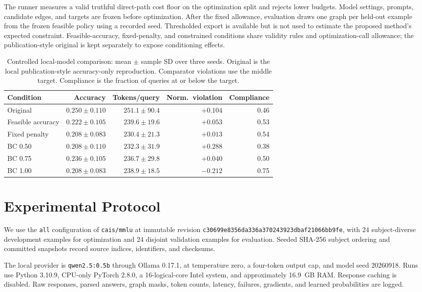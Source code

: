 \documentclass[journal]{IEEEtran}
\begin{document}
The runner measures a valid truthful direct-path cost floor on the optimization split and rejects lower budgets. Model settings, prompts, candidate edges, and targets are frozen before optimization. After the fixed allowance, evaluation draws one graph per held-out example from the frozen feasible policy using a recorded seed. Thresholded export is available but is not used to estimate the proposed method's expected constraint. Feasible-accuracy, fixed-penalty, and constrained conditions share validity rules and optimization-call allowance; the publication-style original is kept separately to expose conditioning effects.

\begin{table}[t]
\centering\small
\caption{Controlled local-model comparison: mean $\pm$ sample SD over three seeds. Original is the local publication-style accuracy-only reproduction. Comparator violations use the middle target. Compliance is the fraction of queries at or below the target.}
\label{tab:main}
\begin{tabular}{lrrrr}
\hline
Condition & Accuracy & Tokens/query & Norm.\ violation & Compliance\\
\hline
Original & $0.250\pm0.110$ & $251.1\pm90.4$ & $+0.104$ & 0.46\\
Feasible accuracy & $0.222\pm0.105$ & $239.6\pm19.6$ & $+0.053$ & 0.53\\
Fixed penalty & $0.208\pm0.083$ & $230.4\pm21.3$ & $+0.013$ & 0.54\\
BC 0.50 & $0.208\pm0.110$ & $232.3\pm31.9$ & $+0.288$ & 0.38\\
BC 0.75 & $0.236\pm0.105$ & $236.7\pm29.8$ & $+0.040$ & 0.50\\
BC 1.00 & $0.208\pm0.083$ & $238.9\pm18.5$ & $-0.212$ & 0.75\\
\hline
\end{tabular}
\end{table}

\section{Experimental Protocol}
We use the \texttt{all} configuration of \texttt{cais/mmlu} at immutable revision \texttt{c30699e8356da336a370243923dbaf21066bb9fe}, with 24 subject-diverse development examples for optimization and 24 disjoint validation examples for evaluation. Seeded SHA-256 subject ordering and committed snapshots record source indices, identifiers, and checksums.

The local provider is \texttt{qwen2.5:0.5b} through Ollama 0.17.1, at temperature zero, a four-token output cap, and model seed 20260918. Runs use Python 3.10.9, CPU-only PyTorch 2.8.0, a 16-logical-core Intel system, and approximately 16.9~GB RAM. Response caching is disabled. Raw responses, parsed answers, graph masks, token counts, latency, failures, gradients, and learned probabilities are logged.
\end{document}
